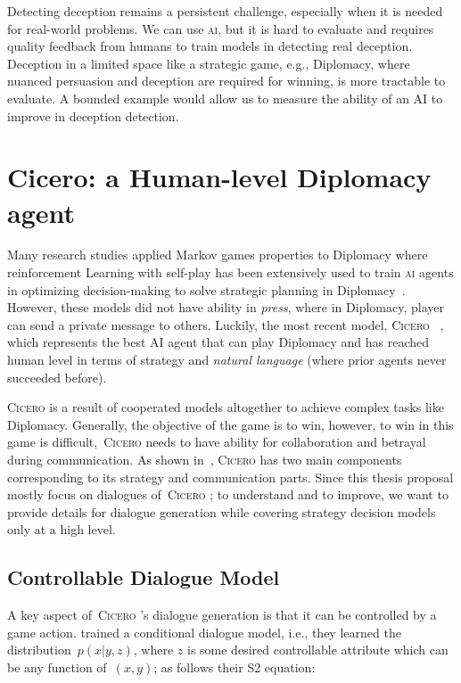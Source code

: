 \documentclass[oneside]{memoir}
\newcommand{\cicero}{\abr{Cicero} }
\newcommand{\abr}[1]{\textsc{#1}}
\begin{document}
Detecting deception remains a persistent challenge, especially when it is needed for real-world problems. We can use \abr{ai}, but it is hard to evaluate and requires quality feedback from humans to train models in detecting real deception. 
%
Deception in a limited space like a strategic game, e.g., Diplomacy, where nuanced persuasion and deception are required for winning, is more tractable to evaluate.
%
A bounded example would allow us to measure the ability of an AI to improve in deception detection.


\section{Cicero: a Human-level Diplomacy agent}
Many research studies applied Markov games properties to Diplomacy where reinforcement Learning with self-play has been extensively used to train \abr{ai} agents in optimizing decision-making to solve strategic planning in Diplomacy~\citep{NEURIPS2019_84b20b1f,anthony2020learning,gray2020human,bakhtin2021nopress}. However, these models did not have ability in \textit{press}, where in Diplomacy, player can send a private message to others. Luckily, the most recent model, 
\cicero~\citep{meta2022human}, which represents the best AI agent that can play Diplomacy and has reached human level in terms of strategy and \textit{natural language} (where prior agents never succeeded before). 

\cicero is a result of cooperated models altogether to achieve complex tasks like Diplomacy. Generally, the objective of the game is to win, however, to win in this game is difficult,~\cicero needs to have ability for collaboration and betrayal during communication. As shown in~\cite{meta2022human}, \cicero has two main components corresponding to its strategy and communication parts. Since this thesis proposal mostly focus on dialogues of~\cicero; to understand and to improve, we want to provide details for dialogue generation while covering strategy decision models only at a high level. 

\subsection{Controllable Dialogue Model}
A key aspect of~\cicero’s dialogue generation is that it can be controlled by a game action. \cite{meta2022human} trained a conditional dialogue model, i.e., they learned the distribution~$p(x|y,z)$, where $z$ is some desired controllable attribute which can be any function of~$(x, y)$; as follows their S2 equation:
\end{document}
